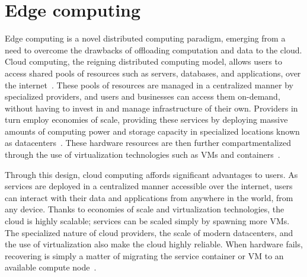 \section{Edge computing}
\glsresetall%

Edge computing is a novel distributed computing paradigm, emerging from a need to overcome the drawbacks of offloading computation and data to the cloud.
Cloud computing, the reigning distributed computing model, allows users to access shared pools of resources such as servers, databases, and applications, over the internet~\cite{gai2012towards}.
These pools of resources are managed in a centralized manner by specialized providers, and users and businesses can access them on-demand, without having to invest in and manage infrastructure of their own.
Providers in turn employ economies of scale, providing these services by deploying massive amounts of computing power and storage capacity in specialized locations known as datacenters~\citationeeded.
These hardware resources are then further compartmentalized through the use of virtualization technologies such as \glspl{VM} and containers~\cite{gai2012towards}.

Through this design, cloud computing affords significant advantages to users.
As services are deployed in a centralized manner accessible over the internet, users can interact with their data and applications from anywhere in the world, from any device.
Thanks to economies of scale and virtualization technologies, the cloud is highly scalable;
services can be scaled simply by spawning more \glspl{VM}.
The specialized nature of cloud providers, the scale of modern datacenters, and the use of virtualization also make the cloud highly reliable.
When hardware fails, recovering is simply a matter of migrating the service container or \gls{VM} to an available compute node~\cite{endo2016high}.

